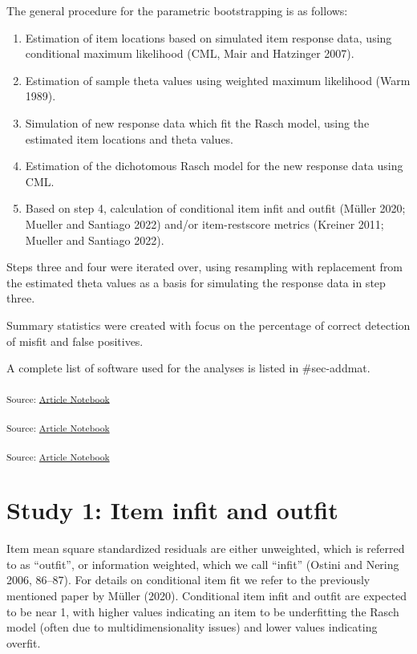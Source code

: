 \documentclass[
  letterpaper,
  DIV=11,
  numbers=noendperiod]{scrartcl}
\providecommand{\tightlist}{%
  \setlength{\itemsep}{0pt}\setlength{\parskip}{0pt}}\usepackage{longtable,booktabs,array}
\begin{document}
The general procedure for the parametric bootstrapping is as follows:

\begin{enumerate}
\def\labelenumi{\arabic{enumi}.}
\tightlist
\item
  Estimation of item locations based on simulated item response data,
  using conditional maximum likelihood (CML, Mair and Hatzinger 2007).
\item
  Estimation of sample theta values using weighted maximum likelihood
  (Warm 1989).
\item
  Simulation of new response data which fit the Rasch model, using the
  estimated item locations and theta values.
\item
  Estimation of the dichotomous Rasch model for the new response data
  using CML.
\item
  Based on step 4, calculation of conditional item infit and outfit
  (Müller 2020; Mueller and Santiago 2022) and/or item-restscore metrics
  (Kreiner 2011; Mueller and Santiago 2022).
\end{enumerate}

Steps three and four were iterated over, using resampling with
replacement from the estimated theta values as a basis for simulating
the response data in step three.

Summary statistics were created with focus on the percentage of correct
detection of misfit and false positives.

A complete list of software used for the analyses is listed in
\#sec-addmat.

\textsubscript{Source:
\href{https://pgmj.github.io/rasch_itemfit/index.qmd.html}{Article
Notebook}}

\textsubscript{Source:
\href{https://pgmj.github.io/rasch_itemfit/index.qmd.html}{Article
Notebook}}

\textsubscript{Source:
\href{https://pgmj.github.io/rasch_itemfit/index.qmd.html}{Article
Notebook}}

\section{Study 1: Item infit and
outfit}\label{study-1-item-infit-and-outfit}

Item mean square standardized residuals are either unweighted, which is
referred to as ``outfit'', or information weighted, which we call
``infit'' (Ostini and Nering 2006, 86--87). For details on conditional
item fit we refer to the previously mentioned paper by Müller (2020).
Conditional item infit and outfit are expected to be near 1, with higher
values indicating an item to be underfitting the Rasch model (often due
to multidimensionality issues) and lower values indicating overfit.
\end{document}
